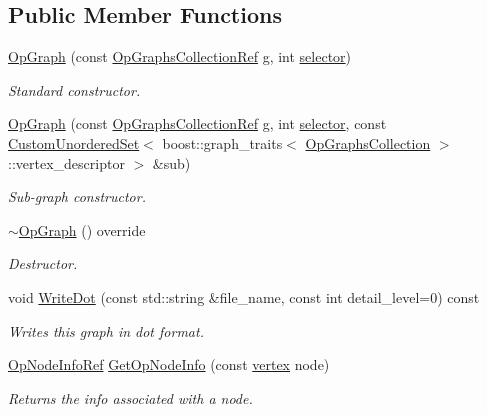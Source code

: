 \subsection*{Public Member Functions}
\begin{DoxyCompactItemize}
\item 
\hyperlink{structOpGraph_ad33a9474567bc8dc3eaaf1c010f5903e}{Op\+Graph} (const \hyperlink{op__graph_8hpp_a6a9918dc96f448814ad35759f9460ed7}{Op\+Graphs\+Collection\+Ref} g, int \hyperlink{structgraph_ab06c362711200ca8c15e3d85fef7957b}{selector})
\begin{DoxyCompactList}\small\item\em Standard constructor. \end{DoxyCompactList}\item 
\hyperlink{structOpGraph_a2bcc85b20d650908aeb085f510f52309}{Op\+Graph} (const \hyperlink{op__graph_8hpp_a6a9918dc96f448814ad35759f9460ed7}{Op\+Graphs\+Collection\+Ref} g, int \hyperlink{structgraph_ab06c362711200ca8c15e3d85fef7957b}{selector}, const \hyperlink{classCustomUnorderedSet}{Custom\+Unordered\+Set}$<$ boost\+::graph\+\_\+traits$<$ \hyperlink{classOpGraphsCollection}{Op\+Graphs\+Collection} $>$\+::vertex\+\_\+descriptor $>$ \&sub)
\begin{DoxyCompactList}\small\item\em Sub-\/graph constructor. \end{DoxyCompactList}\item 
\hyperlink{structOpGraph_a7d9ade95757bf16fcf7df469f71bada7}{$\sim$\+Op\+Graph} () override
\begin{DoxyCompactList}\small\item\em Destructor. \end{DoxyCompactList}\item 
void \hyperlink{structOpGraph_a701ba67fb9b76ca7cf399f2af98cf815}{Write\+Dot} (const std\+::string \&file\+\_\+name, const int detail\+\_\+level=0) const
\begin{DoxyCompactList}\small\item\em Writes this graph in dot format. \end{DoxyCompactList}\item 
\hyperlink{op__graph_8hpp_a03ecef2a2ccfe0a14c591757fb6624c4}{Op\+Node\+Info\+Ref} \hyperlink{structOpGraph_a182a5edee5fd5c4c38cf21d3651f7ec1}{Get\+Op\+Node\+Info} (const \hyperlink{graph_8hpp_abefdcf0544e601805af44eca032cca14}{vertex} node)
\begin{DoxyCompactList}\small\item\em Returns the info associated with a node. \end{DoxyCompactList}\item 

\end{DoxyCompactItemize}
